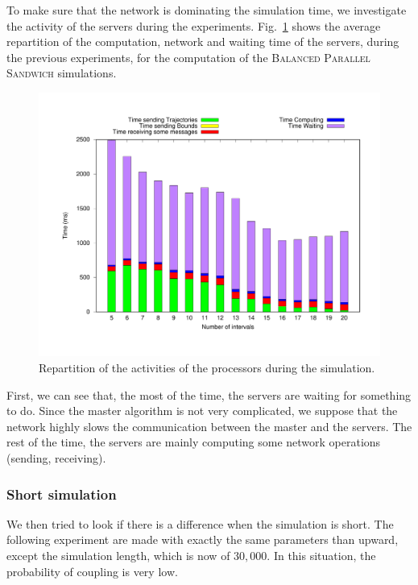 \documentclass[a4paper,10pt]{article}
\begin{document}
To make sure that the network is dominating the simulation time, we investigate the activity of the servers during the experiments. Fig.~\ref{fig:servers} shows the average repartition of the computation, network and waiting time of the servers, during the previous experiments, for the computation of the \textsc{Balanced Parallel Sandwich} simulations.


\begin{figure}[H]
\centering
\label{fig:servers}
 \includegraphics[scale=0.45]{server.pdf}
 \caption{Repartition of the activities of the processors during the simulation.}
\end{figure}

First, we can see that, the most of the time, the servers are waiting for something to do. Since the master algorithm is not very complicated, we suppose that the network highly slows the communication between the master and the servers. The rest of the time, the servers are mainly computing some network operations (sending, receiving).
\subsubsection{Short simulation}
We then tried to look if there is a difference when the simulation is short. The following experiment are made with exactly the same parameters than upward, except the simulation length, which is now of $30,000$. In this situation, the probability of coupling is very low.
\end{document}
